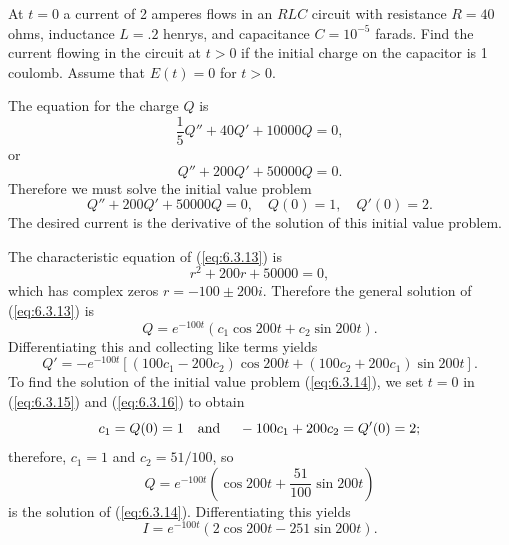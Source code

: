 \setcounter{example}{0}
\begin{example}
  \label{example:6.3.1} \rm At $t=0$ a current of 2 amperes flows in an $RLC$ circuit with
  resistance $R=40$ ohms, inductance $L=.2$ henrys, and capacitance $C=10^{-5}$ farads. Find the
  current flowing in the circuit at $t>0$ if the initial charge on the capacitor is 1 coulomb.
  Assume that $E(t)=0$ for $t>0$.
\end{example}
\setcounter{equation}{12}
\begin{examplesolution}
\solution The equation for the charge $Q$ is
\[
  \frac{1}{5}Q''+40Q'+10000Q=0,
\]
or
\begin{equation}
  \label{eq:6.3.13}Q''+200Q'+50000Q=0.
\end{equation}
Therefore we must solve the initial value problem
\begin{equation}
  \label{eq:6.3.14}Q''+200Q'+50000Q=0,\quad Q(0)=1,\quad Q'(0)=2.
\end{equation}
The desired current is the derivative of the solution of this initial value problem.

The characteristic equation of (\ref{eq:6.3.13}) is
\[
  r^{2}+200r+50000=0,
\]
which has complex zeros $r=-100\pm200i$. Therefore the general solution of (\ref{eq:6.3.13}) is
\begin{equation}
  \label{eq:6.3.15}Q=e^{-100t}(c_{1}\cos200t+c_{2}\sin200t).
\end{equation}
Differentiating this and collecting like terms yields
\begin{equation}
  \label{eq:6.3.16}Q'=-e^{-100t}\left[(100c_{1}-200c_{2})\cos200t+ (100c_{2}+200c_{1})\sin200t\right].
\end{equation}
To find the solution of the initial value problem (\ref{eq:6.3.14}), we set $t=0$ in
(\ref{eq:6.3.15}) and (\ref{eq:6.3.16}) to obtain
\[
  c_{1}=Q(0)=1\mbox{\quad and \quad}-100c_{1}+200c_{2}=Q'(0)=2;
\]
therefore, $c_{1}=1$ and $c_{2}=51/100$, so
\[
  Q=e^{-100t}\left(\cos200t+\frac{51}{100}\sin200t\right)
\]
is the solution of (\ref{eq:6.3.14}). Differentiating this yields
\[
  I=e^{-100t}(2\cos200t-251\sin200t).
\]
\end{examplesolution}


